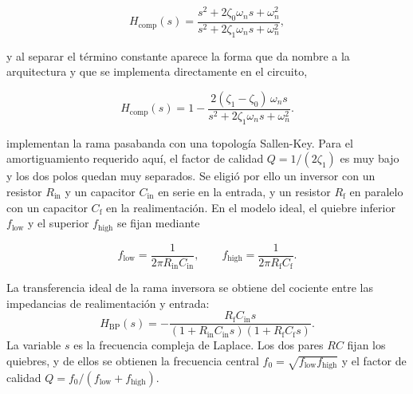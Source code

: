 \begin{equation}
H_{\mathrm{comp}}(s)=\frac{s^{2}+2\zeta_0\omega_n s+\omega_n^{2}}{s^{2}+2\zeta_1\omega_n s+\omega_n^{2}},
\end{equation}

y al separar el término constante aparece la forma que da nombre a la arquitectura y que se implementa directamente en el circuito,

\begin{equation}
H_{\mathrm{comp}}(s)=1-\frac{2(\zeta_1-\zeta_0)\,\omega_n s}{s^{2}+2\zeta_1\omega_n s+\omega_n^{2}}.
\end{equation}

 implementan la rama pasabanda con una topología Sallen-Key. Para el amortiguamiento requerido aquí, el factor de calidad $Q=1/(2\zeta_1)$ es muy bajo y los dos polos quedan muy separados. Se eligió por ello un inversor con un resistor $R_{\mathrm{in}}$ y un capacitor $C_{\mathrm{in}}$ en serie en la entrada, y un resistor $R_{\mathrm{f}}$ en paralelo con un capacitor $C_{\mathrm{f}}$ en la realimentación. En el modelo ideal, el quiebre inferior $f_{\mathrm{low}}$ y el superior $f_{\mathrm{high}}$ se fijan mediante

\begin{equation}
f_{\mathrm{low}}=\frac{1}{2\pi R_{\mathrm{in}}C_{\mathrm{in}}},
\qquad
f_{\mathrm{high}}=\frac{1}{2\pi R_{\mathrm{f}}C_{\mathrm{f}}}.
\end{equation}

La transferencia ideal de la rama inversora se obtiene del cociente entre las impedancias de realimentación y entrada:
\begin{equation}
H_{\mathrm{BP}}(s)=
-\frac{R_{\mathrm f}C_{\mathrm{in}}s}
{(1+R_{\mathrm{in}}C_{\mathrm{in}}s)
(1+R_{\mathrm f}C_{\mathrm f}s)}.
\label{eq:bp-rc}
\end{equation}
La variable $s$ es la frecuencia compleja de Laplace. Los dos pares $RC$ fijan los quiebres, y de ellos se obtienen la frecuencia central $f_0=\sqrt{f_{\mathrm{low}}f_{\mathrm{high}}}$ y el factor de calidad $Q=f_0/(f_{\mathrm{low}}+f_{\mathrm{high}})$.


